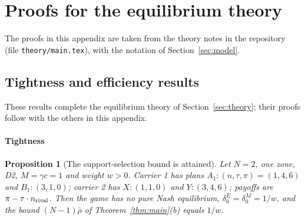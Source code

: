 \documentclass[preprint,11pt]{elsarticle}
\newtheorem{proposition}[theorem]{Proposition}
\theoremstyle{definition}
\theoremstyle{remark}
\begin{document}
\begin{table}[h]\centering\small
\caption{Out-of-sample comparison on the public instances (17 cells per row), polished plans, relative to the sample-average plan with the same number of training days. Held-out: 2000 days from the training law; shifted law: excess congestion $\times1.5$, volatility $\times1.25$, no re-solving.}\label{tab:brl-oos}
\end{table}

\begin{table}[h]\centering\small
\caption{Leader methods on four cities, seeds 0--2 (exact oracle). $\varrho$: contraction constant of Theorem~\ref{thm:rate}. ARP: flat rule, status and rounds (a cycle is a repeated charge and market state). Gains are percentages of the best exact grid point's gain; tariff+BR: marginal tariff with the carriers' own best responses; tariff+SO: tariff with the potential solver. Calls: oracle calls of the carriers during the method. Mumbai's grid is reduced (gains relative to a lower bound).}\label{tab:arp}
\end{table}

\clearpage

\section{Proofs for the equilibrium theory}\label{app:proofs}

The proofs in this appendix are taken from the theory notes in the repository (file \texttt{theory/main.tex}), with the notation of Section~\ref{sec:model}.

\subsection{Tightness and efficiency results}\label{app:tightness}

These results complete the equilibrium theory of Section~\ref{sec:theory}; their proofs follow with the others in this appendix.

\paragraph{Tightness}

\begin{proposition}[The support-selection bound is attained]\label{prop:tight}
Let $N=2$, one zone, D2, $M=\gamma c=1$ and weight $w>0$. Carrier 1 has plans $A_1:(n,\tau,\pi)=(1,4,6)$ and $B_1:(3,1,0)$; carrier 2 has $X:(1,1,0)$ and $Y:(3,4,6)$; payoffs are $\pi-\tau\cdot n_{\rm rival}$. Then the game has no pure Nash equilibrium, $\delta_0^E=\delta_0^M=1/w$, and the bound $(N-1)\bar\rho$ of Theorem~\ref{thm:main}(b) equals $1/w$.
\end{proposition}
\end{document}
